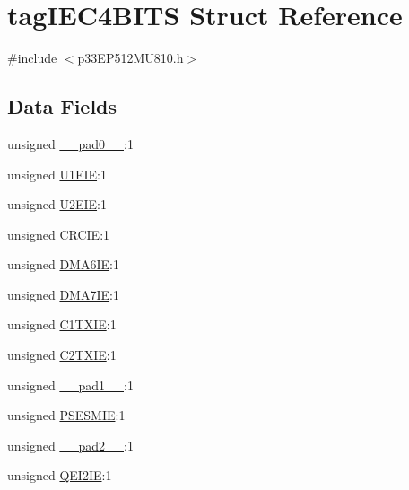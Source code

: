 \hypertarget{structtag_i_e_c4_b_i_t_s}{}\section{tag\+I\+E\+C4\+B\+I\+TS Struct Reference}
\label{structtag_i_e_c4_b_i_t_s}


{\ttfamily \#include $<$p33\+E\+P512\+M\+U810.\+h$>$}

\subsection*{Data Fields}
\begin{DoxyCompactItemize}
\item 
unsigned \hyperlink{structtag_i_e_c4_b_i_t_s_adf71f3d8410c1f1dbbc96680a92c49af}{\+\_\+\+\_\+pad0\+\_\+\+\_\+}\+:1
\item 
unsigned \hyperlink{structtag_i_e_c4_b_i_t_s_a2c53adea7c812c57e63ee8456d0c272b}{U1\+E\+IE}\+:1
\item 
unsigned \hyperlink{structtag_i_e_c4_b_i_t_s_af9bb0592109b652c78294072ea7a6d18}{U2\+E\+IE}\+:1
\item 
unsigned \hyperlink{structtag_i_e_c4_b_i_t_s_a87f53093e5caf41e3c0a38fb6cd00cf9}{C\+R\+C\+IE}\+:1
\item 
unsigned \hyperlink{structtag_i_e_c4_b_i_t_s_afaa1e4cf20ae6bcf6c4e6c35e56a73e2}{D\+M\+A6\+IE}\+:1
\item 
unsigned \hyperlink{structtag_i_e_c4_b_i_t_s_aec5c4575fc18d9992c2cc262bcf6fb51}{D\+M\+A7\+IE}\+:1
\item 
unsigned \hyperlink{structtag_i_e_c4_b_i_t_s_a63cad8ddb45da9bf6c678d302e1dd6a5}{C1\+T\+X\+IE}\+:1
\item 
unsigned \hyperlink{structtag_i_e_c4_b_i_t_s_a83ee271340b207e7a064bf431d61f75c}{C2\+T\+X\+IE}\+:1
\item 
unsigned \hyperlink{structtag_i_e_c4_b_i_t_s_acaf2d0924a107ec6e8d2e31febaf66f9}{\+\_\+\+\_\+pad1\+\_\+\+\_\+}\+:1
\item 
unsigned \hyperlink{structtag_i_e_c4_b_i_t_s_a9d70d4723e2e663cfe5c0c680333343f}{P\+S\+E\+S\+M\+IE}\+:1
\item 
unsigned \hyperlink{structtag_i_e_c4_b_i_t_s_a4d97cc5f7d51d22fc2bf3eab35c9cb7f}{\+\_\+\+\_\+pad2\+\_\+\+\_\+}\+:1
\item 
unsigned \hyperlink{structtag_i_e_c4_b_i_t_s_a283729eb804930ecf68fc332686c9813}{Q\+E\+I2\+IE}\+:1
\end{DoxyCompactItemize}


